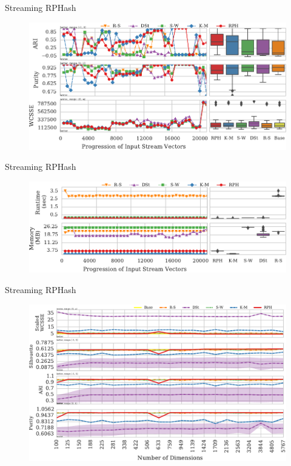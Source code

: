 \documentclass[12pt]{beamer}
\begin{document}
\begin{frame}[plain]{Streaming RPHash}
\begin{figure}
 \centerline{\includegraphics[width=1.\textwidth]{figs/resultsUJII}}
\end{figure}
\end{frame}

\begin{frame}[plain]{Streaming RPHash}
\begin{figure}
 \centerline{\includegraphics[width=1.\textwidth]{figs/runtimeUJII}}
\end{figure}
\end{frame}

\begin{frame}[plain]{Streaming RPHash}
\begin{figure}
 \centerline{\includegraphics[width=1.\textwidth]{figs/measure_scale}}
\end{figure}
\end{frame}
\end{document}

